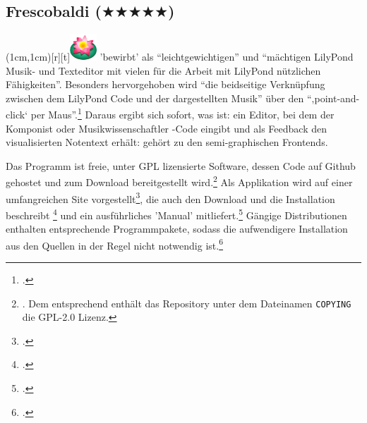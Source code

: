 %
%
%



\subsection{Frescobaldi ($\bigstar\bigstar\bigstar\bigstar\bigstar$)}

\parpic(1cm,1cm)[r][t]{\includegraphics[width=1cm]{logos/frescobaldi-300dpi.png}}
\label{Frescobaldi} 'bewirbt'  als
\enquote{leichtgewichtigen} und \enquote{mächtigen LilyPond Musik- und
Texteditor mit vielen für die Arbeit mit LilyPond nützlichen Fähigkeiten}.
Besonders hervorgehoben wird \enquote{die beidseitige Verknüpfung zwischen dem
LilyPond Code und der dargestellten Musik} über den \enquote{‚point-and-click‘
per Maus}.\footcite[vgl.][\nopage wp]{LilyPond2018g} Daraus ergibt sich sofort,
was  ist: ein Editor, bei dem der Komponist oder
Musikwissenschaftler -Code eingibt und als Feedback den
visualisierten Notentext erhält:  gehört zu den
semi-graphischen Frontends.

Das Programm ist freie, unter GPL lizensierte Software, dessen Code auf Github
ge\-hos\-tet und zum Download bereitgestellt wird.\footnote{\cite[vgl.][\nopage
wp]{Frescobaldi2019a}. Dem entsprechend enthält das Repository unter dem
Dateinamen \texttt{COPYING} die GPL-2.0 Lizenz.} Als Applikation wird
 auf einer umfangreichen Site vorgestellt\footcite[vgl.][\nopage
wp]{Frescobaldi2017a}, die auch den Download und die Installation beschreibt
\footcite[vgl.][\nopage wp]{Frescobaldi2015a} und ein ausführliches 'Manual'
mitliefert.\footcite[vgl.][\nopage wp]{Frescobaldi2012a} Gängige Distributionen
enthalten entsprechende Programmpakete, sodass die aufwendigere Installation aus
den Quellen in der Regel nicht notwendig ist.\footcite[vgl.][\nopage
wp]{UbuntuFrescobaldi2016a}

